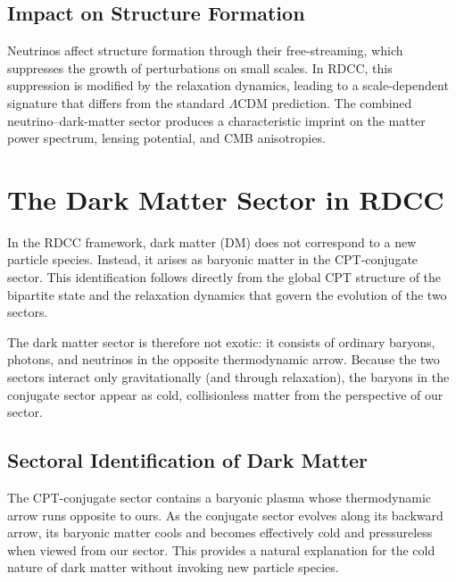 \documentclass[11pt,a4paper]{article}
\begin{document}

\subsection{Impact on Structure Formation}

Neutrinos affect structure formation through their free-streaming, which
suppresses the growth of perturbations on small scales. In RDCC, this
suppression is modified by the relaxation dynamics, leading to a
scale-dependent signature that differs from the standard $\Lambda$CDM
prediction. The combined neutrino–dark-matter sector produces a characteristic
imprint on the matter power spectrum, lensing potential, and CMB anisotropies.


\section{The Dark Matter Sector in RDCC}

In the RDCC framework, dark matter (DM) does not correspond to a new particle
species. Instead, it arises as baryonic matter in the CPT-conjugate sector.
This identification follows directly from the global CPT structure of the
bipartite state and the relaxation dynamics that govern the evolution of the
two sectors.

The dark matter sector is therefore not exotic: it consists of ordinary
baryons, photons, and neutrinos in the opposite thermodynamic arrow. Because
the two sectors interact only gravitationally (and through relaxation), the
baryons in the conjugate sector appear as cold, collisionless matter from the
perspective of our sector.




\subsection{Sectoral Identification of Dark Matter}

The CPT-conjugate sector contains a baryonic plasma whose thermodynamic arrow
runs opposite to ours. As the conjugate sector evolves along its backward arrow,
its baryonic matter cools and becomes effectively cold and pressureless when
viewed from our sector. This provides a natural explanation for the cold nature
of dark matter without invoking new particle species.
\end{document}
